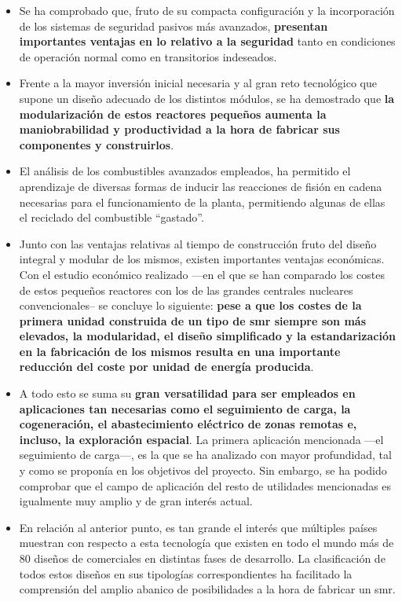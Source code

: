 \begin{itemize}
    \item Se ha comprobado que, fruto de su compacta configuración y la incorporación de los sistemas de seguridad pasivos más avanzados, \textbf{presentan importantes ventajas en lo relativo a la seguridad} tanto en condiciones de operación normal como en transitorios indeseados.
    \item Frente a la mayor inversión inicial necesaria y al gran reto tecnológico que supone un diseño adecuado de los distintos módulos, se ha demostrado que \textbf{la modularización de estos reactores pequeños aumenta la maniobrabilidad y productividad a la hora de fabricar sus componentes y construirlos}.
    \item El análisis de los combustibles avanzados empleados, ha permitido el aprendizaje de diversas formas de inducir las reacciones de fisión en cadena necesarias para el funcionamiento de la planta, permitiendo algunas de ellas el reciclado del combustible ``gastado''.
    \item Junto con las ventajas relativas al tiempo de construcción fruto del diseño integral y modular de los mismos, existen importantes ventajas económicas. Con el estudio económico realizado ---en el que se han comparado los costes de estos pequeños reactores con los de las grandes centrales nucleares convencionales-- se concluye lo siguiente: \textbf{pese a que los costes de la primera unidad construida de un tipo de \acrshort{smr} siempre son más elevados, la modularidad, el diseño simplificado y la estandarización en la fabricación de los mismos resulta en una importante reducción del coste por unidad de energía producida}.
    \item A todo esto se suma su \textbf{gran versatilidad para ser empleados en aplicaciones tan necesarias como el seguimiento de carga, la cogeneración, el abastecimiento eléctrico de zonas remotas e, incluso, la exploración espacial}. La primera aplicación mencionada ---el seguimiento de carga---, es la que se ha analizado con mayor profundidad, tal y como se proponía en los objetivos del proyecto. Sin embargo, se ha podido comprobar que el campo de aplicación del resto de utilidades mencionadas es igualmente muy amplio y de gran interés actual.
    \item En relación al anterior punto, es tan grande el interés que múltiples países muestran con respecto a esta tecnología que existen en todo el mundo más de 80 diseños de  comerciales en distintas fases de desarrollo. La clasificación de todos estos diseños en sus tipologías correspondientes ha facilitado la comprensión del amplio abanico de posibilidades a la hora de fabricar un \acrshort{smr}.

\end{itemize}
